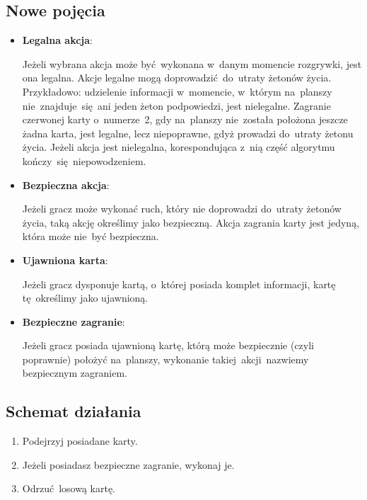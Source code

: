 \documentclass[declaration,shortabstract,inz]{iithesis}
\begin{document}
\subsection*{Nowe pojęcia}

\begin{itemize}

	\item \textbf{Legalna akcja}:
	
	Jeżeli wybrana akcja może być wykonana w~danym momencie rozgrywki, jest ona legalna. Akcje legalne mogą doprowadzić do~utraty żetonów życia. Przykładowo: udzielenie informacji w~momencie, w~którym na~planszy nie~znajduje~się ani jeden żeton podpowiedzi, jest nielegalne. Zagranie czerwonej karty o~numerze~2, gdy na~planszy nie~została położona jeszcze żadna karta, jest legalne, lecz niepoprawne, gdyż prowadzi do~utraty żetonu życia. Jeżeli akcja jest nielegalna, korespondująca z~nią część algorytmu kończy~się niepowodzeniem.
	
	\item \textbf{Bezpieczna akcja}:
	
	Jeżeli gracz może wykonać ruch, który nie doprowadzi do~utraty żetonów życia, taką akcję określimy jako bezpieczną. Akcja zagrania karty jest jedyną, która może nie~być bezpieczna.
	
	\item \textbf{Ujawniona karta}:
	
	Jeżeli gracz dysponuje kartą, o~której posiada komplet informacji, kartę tę~określimy jako ujawnioną.
	
	\item \textbf{Bezpieczne zagranie}:
	
	Jeżeli gracz posiada ujawnioną kartę, którą może bezpiecznie (czyli poprawnie) położyć na~planszy, wykonanie takiej akcji nazwiemy bezpiecznym zagraniem.
\end{itemize}

\subsection*{Schemat działania}

\begin{enumerate}
	\item Podejrzyj posiadane karty.
	\item Jeżeli posiadasz bezpieczne zagranie, wykonaj je.
	\item Odrzuć losową kartę.
\end{enumerate}
\end{document}
